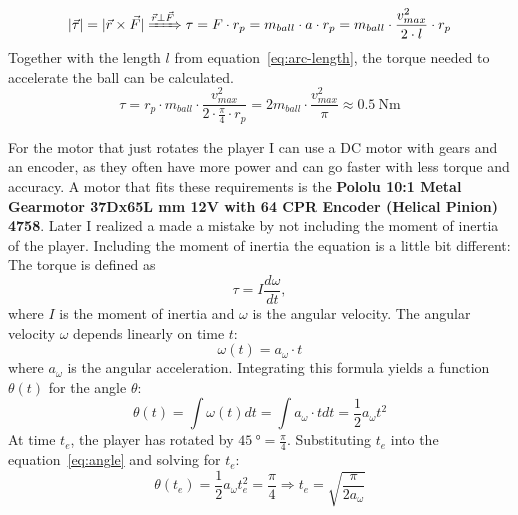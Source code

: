 \begin{equation}
    \label{eq:torque_shoot}
    |\vec{\tau}| = |\vec{r} \times \vec{F}| \xRightarrow{\vec{r} \perp \vec{F}} \tau = F \cdot r_p = m_{ball} \cdot a \cdot r_p = m_{ball} \cdot \frac{v_{max}^2}{2 \cdot l} \cdot r_p
\end{equation}
Together with the length $l$ from equation~\ref{eq:arc-length}, the torque needed to accelerate the ball can be calculated.
\begin{equation}
    \label{eq:torque_shoot_substituted}
    \tau = r_p \cdot m_{ball} \cdot \frac{v_{max}^2}{2\cdot\frac{\pi}{4}\cdot r_p} = 2m_{ball} \cdot \frac{v_{max}^2}{\pi} \approx \qty[per-mode=symbol]{0.5}{\N\m}
\end{equation}



For the motor that just rotates the player I can use a DC motor with gears and an encoder, as they often have more power and can go faster with less torque and accuracy.
A motor that fits these requirements is the \textbf{Pololu 10:1 Metal Gearmotor 37Dx65L mm 12V with 64 CPR Encoder (Helical Pinion) 4758}\autocite{pololu-dc}.
Later I realized a made a mistake by not including the moment of inertia of the player.
Including the moment of inertia the equation is a little bit different:
The torque is defined as
\begin{equation}
    \label{eq:torque2}
    \tau = I \frac{d\omega}{dt},
\end{equation}
where $I$ is the moment of inertia and $\omega$ is the angular velocity.
The angular velocity $\omega$ depends linearly on time $t$:
\begin{equation}
    \label{eq:angular_velocity}
    \omega(t) = a_\omega \cdot t
\end{equation}
where $a_\omega$ is the angular acceleration.
Integrating this formula yields a function $\theta(t)$ for the angle $\theta$:
\begin{equation}
    \label{eq:angle}
    \theta(t) = \int \omega(t)dt = \int a_\omega \cdot t dt = \frac{1}{2} a_\omega t^2
\end{equation}
At time $t_e$, the player has rotated by $\qty[per-mode=symbol]{45}{\degree} = \frac{\pi}{4}$.
Substituting $t_e$ into the equation~\ref{eq:angle} and solving for $t_e$:
\begin{equation}
    \label{eq:time_to_rotate}
    \theta(t_e)= \frac{1}{2} a_\omega t_e^2 = \frac{\pi}{4} \Rightarrow t_e = \sqrt{\frac{\pi}{2a_\omega}}
\end{equation}
